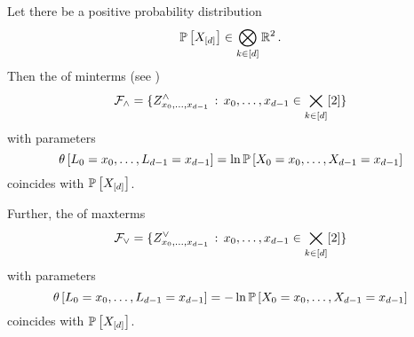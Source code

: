 \begin{theorem}
    \label{the:maximalClausesRepresentation}\label{the:mintermExpressivityMLN}
    Let there be a positive probability distribution
    \[ \mathbb{P}\left[X_{[d]}\right] \in \bigotimes_{k\in[d]}\mathbb{R}^2 \, . \]
    Then the \MarkovLogicNetwork{} of minterms (see )
    \[ \mathcal{F}_{\land} = \{Z^{\land}_{{x_{0},\ldots,x_{d-1}}} \,:\, {x_{0},\ldots,x_{d-1}}\in\bigtimes_{k\in[d]}[2] \}\]
    with parameters %
    \[ \canparamat{\selvariableof{0}=\catindexof{0},\ldots,\selvariableof{\atomorder-1}=\catindexof{\atomorder-1}}%
    = \ln \probat{\indexedcatvariables} \]
    coincides with $\mathbb{P}\left[X_{[d]}\right]$.

    Further, the \MarkovLogicNetwork{} of maxterms
    \[ \mathcal{F}_{\lor} = \{Z^{\lor}_{{x_{0},\ldots,x_{d-1}}} \,:\, {x_{0},\ldots,x_{d-1}}\in\bigtimes_{k\in[d]}[2] \}\]
    with parameters
    \[ \canparamat{\selvariableof{0}=\catindexof{0},\ldots,\selvariableof{\atomorder-1}=\catindexof{\atomorder-1}} %
    = - \ln\probat{\indexedcatvariables} \]
    coincides with $\mathbb{P}\left[X_{[d]}\right]$.
\end{theorem}
